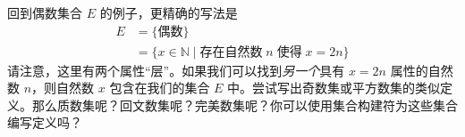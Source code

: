 回到偶数集合 $E$ 的例子，更精确的写法是
\begin{align*}
    E &= \{\text{偶数}\} \\
      &= \{x \in \mathbb{N} \mid \text{存在自然数}\; n \;\text{使得}\; x = 2n\}
\end{align*}
请注意，这里有两个属性``层''。如果我们可以找到\emph{另一个}具有 $x = 2n$ 属性的自然数 $n$，则自然数 $x$ 包含在我们的集合 $E$ 中。尝试写出奇数集或平方数集的类似定义。那么质数集呢？回文数集呢？完美数集呢？你可以使用集合构建符为这些集合编写定义吗？

